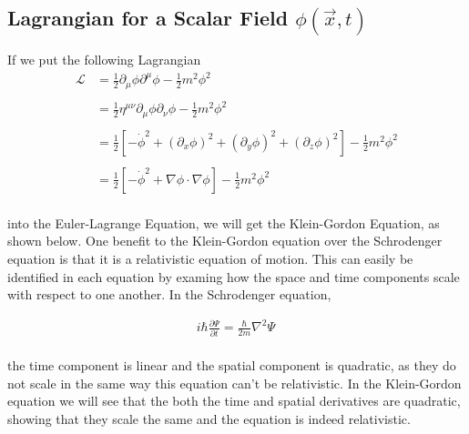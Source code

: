 \documentclass[aps,secnumarabic,nobalancelastpage,amsmath,amssymb,
nofootinbib]{revtex4}
\newcommand{\Lagr}{\mathcal{L}}
\begin{document}
\subsection{Lagrangian for a Scalar Field $\phi(\vec{x},t)$}
\noindent If we put the following Lagrangian\\
\begin{equation}
\begin{aligned}
\Lagr &= \frac{1}{2} \partial_\mu \phi \partial^\mu \phi - \frac{1}{2} m^2 \phi^2\\
\\
 &= \frac{1}{2} \eta^{\mu\nu} \partial_\mu \phi \partial_\nu \phi - \frac{1}{2} m^2 \phi^2 \\
\\
&= \frac{1}{2} [-\dot{\phi}^2 + (\partial_x \phi)^2+(\partial_y \phi)^2+(\partial_z \phi)^2] - \frac{1}{2} m^2 \phi^2\\
\\
&= \frac{1}{2} [-\dot{\phi}^2 + \nabla \phi  \cdot \nabla \phi] - \frac{1}{2} m^2 \phi^2\\
\, \label{eq:tenth-equation}
\end{aligned}
\end{equation}

\noindent into the Euler-Lagrange Equation, we will get the Klein-Gordon Equation, as shown below. One benefit to the Klein-Gordon equation over the Schrodenger equation is that it is a relativistic equation of motion. This can easily be identified in each equation by examing how the space and time components scale with respect to one another. In the Schrodenger equation, 

\begin{equation}
\begin{split}
i \hbar \frac{\partial \Psi}{\partial t} = \frac{\hbar}{2 m} \nabla^2 \Psi
\, \label{eq:11}
\end{split}
\end{equation}
\\
the time component is linear and the spatial component is quadratic, as they do not scale in the same way this equation can't be relativistic. In the Klein-Gordon equation we will see that the both the time and spatial derivatives are quadratic, showing that they scale the same and the equation is indeed relativistic.
\end{document}

